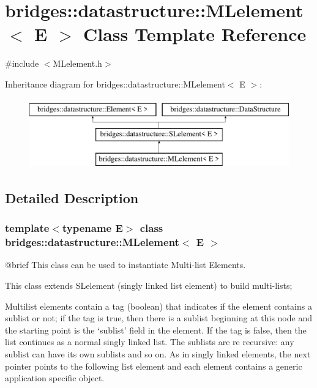\hypertarget{classbridges_1_1datastructure_1_1_m_lelement}{}\section{bridges\+::datastructure\+::M\+Lelement$<$ E $>$ Class Template Reference}
\label{classbridges_1_1datastructure_1_1_m_lelement}


{\ttfamily \#include $<$M\+Lelement.\+h$>$}

Inheritance diagram for bridges\+::datastructure\+::M\+Lelement$<$ E $>$\+:\begin{figure}[H]
\begin{center}
\leavevmode
\includegraphics[height=3.000000cm]{classbridges_1_1datastructure_1_1_m_lelement}
\end{center}
\end{figure}


\subsection{Detailed Description}
\subsubsection*{template$<$typename E$>$\newline
class bridges\+::datastructure\+::\+M\+Lelement$<$ E $>$}

\begin{DoxyVerb}@brief This class can be used to instantiate Multi-list Elements.

This class extends SLelement (singly linked list element) to build multi-lists;
\end{DoxyVerb}
 Multilist elements contain a tag (boolean) that indicates if the element contains a sublist or not; if the tag is true, then there is a sublist beginning at this node and the starting point is the `sublist' field in the element. If the tag is false, then the list continues as a normal singly linked list. The sublists are re recursive\+: any sublist can have its own sublists and so on. As in singly linked elements, the next pointer points to the following list element and each element contains a generic application specific object.

